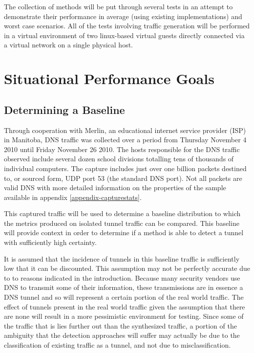 \documentclass[12pt]{report}
\theoremstyle{remark}
\theoremstyle{definition}
\theoremstyle{definition}
\theoremstyle{definition}
\begin{document}
The collection of methods will be put through several tests in an attempt to
demonstrate their performance in average (using existing implementations) and
worst case scenarios. All of the tests involving traffic generation will be
performed in a virtual environment of two linux-based virtual guests directly
connected via a virtual network on a single physical host.

\section{Situational Performance Goals}
\subsection{Determining a Baseline}
\label{baseline}
Through cooperation with Merlin, an educational internet service provider (ISP)
in Manitoba, DNS traffic was collected over a period from Thursday November 4
2010 until Friday November 26 2010. The hosts responsible for the DNS traffic
observed include several dozen school divisions totalling tens of thousands of
individual computers. The capture includes just over one billion packets
destined to, or sourced form, UDP port 53 (the standard DNS port). Not all
packets are valid DNS with more detailed information on the properties of the
sample available in appendix \ref{appendix-capturestats}.

This captured traffic will be used to determine a baseline distribution to which
the metrics produced on isolated tunnel traffic can be compared. This baseline
will provide context in order to determine if a method is able to detect a
tunnel with sufficiently high certainty.

It is assumed that the incidence of tunnels in this baseline traffic is
sufficiently low that it can be discounted. This assumption may not be perfectly
accurate due to to reasons indicated in the introduction. Because many security
vendors use DNS to transmit some of their information, these transmissions are
in essence a DNS tunnel and so will represent a certain portion of the real
world traffic. The effect of tunnels present in the real world traffic given the
assumption that there are none will result in a more pessimistic environment for
testing. Since some of the traffic that is lies further out than the synthesized
traffic, a portion of the ambiguity that the detection approaches will suffer
may actually be due to the classification of existing traffic as a tunnel, and
not due to misclassification.
\end{document}
